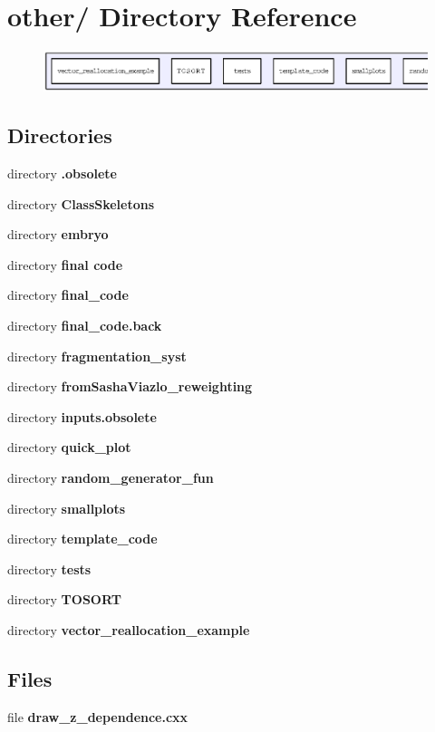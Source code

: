\section{other/ Directory Reference}
\label{dir_1429439c80e7d4e5733d2e6518900cc6}


\begin{figure}[H]
\begin{center}
\leavevmode
\includegraphics[width=420pt]{dir_1429439c80e7d4e5733d2e6518900cc6_dep}
\end{center}
\end{figure}
\subsection*{Directories}
\begin{CompactItemize}
\item 
directory \bf{.obsolete}
\item 
directory \bf{Class\-Skeletons}
\item 
directory \bf{embryo}
\item 
directory \bf{final code}
\item 
directory \bf{final\_\-code}
\item 
directory \bf{final\_\-code.back}
\item 
directory \bf{fragmentation\_\-syst}
\item 
directory \bf{from\-Sasha\-Viazlo\_\-reweighting}
\item 
directory \bf{inputs.obsolete}
\item 
directory \bf{quick\_\-plot}
\item 
directory \bf{random\_\-generator\_\-fun}
\item 
directory \bf{smallplots}
\item 
directory \bf{template\_\-code}
\item 
directory \bf{tests}
\item 
directory \bf{TOSORT}
\item 
directory \bf{vector\_\-reallocation\_\-example}
\end{CompactItemize}
\subsection*{Files}
\begin{CompactItemize}
\item 
file \textbf{draw\_\-z\_\-dependence.cxx}
\end{CompactItemize}
